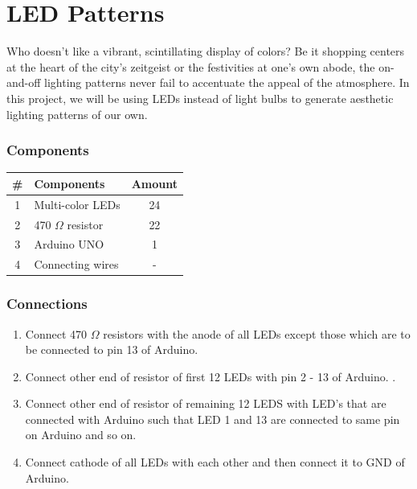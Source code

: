 \chapter{LED Patterns}

Who doesn't like a vibrant, scintillating display of colors? Be it shopping centers at the heart of the city's zeitgeist or the festivities at one's own abode, the on-and-off lighting patterns never fail to accentuate the appeal of the atmosphere. In this project, we will be using LEDs instead of light bulbs to generate aesthetic lighting patterns of our own.

\subsection*{Components}
\begin{table}[H]
    \centering
    \begin{tabular}{|c|l|c|}\hline
     \textbf{\#} & \textbf{Components} &  \textbf{Amount}\\\hline
     1 & Multi-color LEDs       &  24\\\hline
     2 & 470 $\Omega$ resistor   &  22\\\hline
     3 & Arduino UNO            & 1 \\\hline
     4 & Connecting wires       & - \\\hline
    \end{tabular}
\end{table}

\subsection*{Connections}

\begin{enumerate}[leftmargin=*]
    \item Connect 470 $\Omega$ resistors with the anode of all LEDs except those which are to be connected to pin 13 of Arduino.
    \item Connect other end of resistor of first 12 LEDs with pin 2 - 13 of Arduino.  .
    \item Connect other end of resistor of remaining  12 LEDS with LED's that are connected with Arduino such that LED 1 and 13 are connected to same pin on Arduino and so on. 
    \item Connect cathode of all LEDs with each other and then connect it to GND of Arduino.
\end{enumerate}

